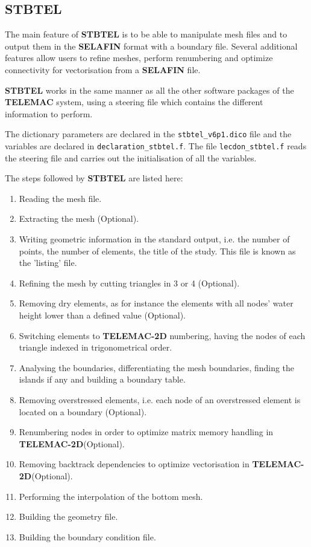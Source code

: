 \documentclass[a4paper,10pt]{article}
\newcommand{\tel}{\textbf{TELEMAC}\xspace}
\newcommand{\teld}{\textbf{TELEMAC-2D}\xspace}
\newcommand{\stb}{\textbf{STBTEL}\xspace}
\newcommand{\slf}{\textbf{SELAFIN}\xspace}
\begin{document}
\subsection{\stb}
The main feature of \stb is to be able to manipulate mesh files and to output them in the \slf 
format with a boundary file. Several additional features allow users to refine meshes, perform renumbering and optimize connectivity for vectorisation
from a \slf file.

\stb works in the same manner as all the other software packages of the \tel system, using a steering file 
which contains the different information to perform.

The dictionary parameters are declared in the \verb+stbtel_v6p1.dico+ file and the variables are declared in
\verb+declaration_stbtel.f+. The file \verb+lecdon_stbtel.f+ reads the steering file and carries out the
initialisation of all the variables.

The steps followed by \stb are listed here:

\begin{enumerate}
\setlength{\itemsep}{1pt}
\setlength{\parskip}{0pt}
\setlength{\parsep}{0pt}
\item Reading the mesh file.
\item Extracting the mesh (Optional).
\item Writing geometric information in the standard output, i.e. the number of points, the number of elements, the title of the study. This file is known as the 'listing' file.
\item Refining the mesh by cutting triangles in 3 or 4 (Optional).
\item Removing dry elements, as for instance the elements with all nodes' water height lower than a defined value (Optional).
\item Switching elements to \teld numbering, having the nodes of each triangle indexed in trigonometrical order.
\item Analysing the boundaries, differentiating the mesh boundaries, finding the islands if any and building a boundary table.
\item Removing overstressed elements, i.e. each node of an overstressed element is located on a boundary (Optional).
\item Renumbering nodes in order to optimize matrix memory handling in \teld (Optional).
\item Removing backtrack dependencies to optimize vectorisation in \teld (Optional).
\item Performing the interpolation of the bottom mesh.
\item Building the geometry file.
\item Building the boundary condition file.
\end{enumerate}
\end{document}
